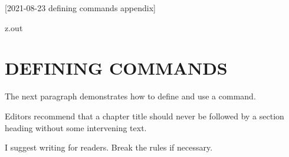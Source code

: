 [2021-08-23 defining commands appendix]

\begin{VerbatimOut}{z.out}
\chapter{DEFINING COMMANDS}

The next paragraph demonstrates how to define and use a command.

\renewcommand{\t}[2]
{%
  Editors recommend that a #1 should never be
  followed by a #2 without some intervening text.
}

\t{chapter title}{section heading}
I suggest writing for readers.
Break the rules if necessary.

\end{VerbatimOut}

\MyIO
